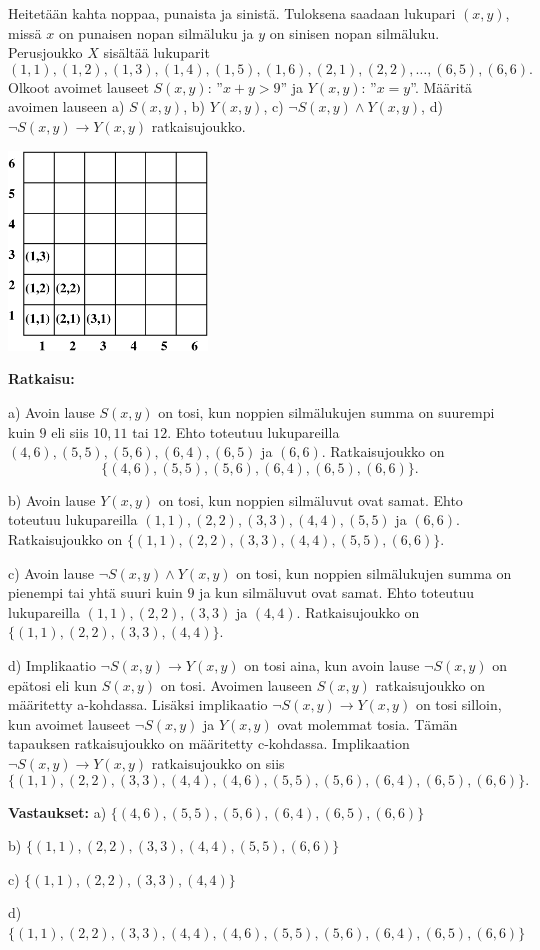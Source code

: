 \begin{esimerkki}
Heitetään kahta noppaa, punaista ja sinistä. Tuloksena saadaan lukupari $(x, y)$, missä $x$ on punaisen nopan silmäluku ja $y$ on sinisen nopan silmäluku. Perusjoukko $X$ sisältää lukuparit
\[
(1, 1), (1, 2), (1, 3), (1, 4), (1, 5), (1, 6), (2, 1), (2, 2),\ldots , (6, 5), (6, 6).
\]
Olkoot avoimet lauseet $S(x,y)$: ''$x + y > 9$'' ja $Y(x,y)$: ''$x = y$''. Määritä avoimen lauseen a) $S(x,y)$, b) $Y(x,y)$, c) $\lnot S(x,y) \land Y(x,y)$, d) $\lnot S(x,y) \to Y(x,y)$ ratkaisujoukko.

\begin{center}
\includegraphics[width=5.3cm]{pictures/6x6}
\end{center}

{\bf Ratkaisu:}

a) Avoin lause $S(x,y)$ on tosi, kun noppien silmälukujen summa on suurempi kuin $9$ eli siis $10, 11$ tai $12$. Ehto toteutuu lukupareilla $(4, 6), (5, 5), (5, 6), (6, 4), (6, 5)$ ja $(6, 6)$. Ratkaisujoukko on
\[
\{(4, 6), (5, 5), (5, 6), (6, 4), (6, 5), (6, 6)\}.
\]

b) Avoin lause $Y(x,y)$ on tosi, kun noppien silmäluvut ovat samat. Ehto toteutuu lukupareilla $(1, 1), (2, 2), (3, 3), (4, 4), (5, 5)$ ja $(6, 6)$. Ratkaisujoukko on $\{(1, 1), (2, 2), (3, 3), (4, 4), (5, 5), (6, 6)\}$.

c) Avoin lause $\lnot S(x,y) \land Y(x,y)$ on tosi, kun noppien silmälukujen summa on pienempi tai yhtä suuri kuin $9$ ja kun silmäluvut ovat samat. Ehto toteutuu lukupareilla $(1,1), (2, 2), (3, 3)$ ja $(4, 4)$. Ratkaisujoukko on $\{(1,1), (2, 2), (3, 3), (4, 4)\}$.


d) Implikaatio $\lnot S(x,y) \to Y(x,y)$ on tosi aina, kun avoin lause $\lnot S(x,y)$ on epätosi eli kun $S(x,y)$ on tosi. Avoimen lauseen $S(x,y)$ ratkaisujoukko on määritetty a-kohdassa. Lisäksi implikaatio $\lnot S(x,y) \to Y(x,y)$ on tosi silloin, kun avoimet lauseet $\lnot S(x,y)$ ja $Y(x,y)$ ovat molemmat tosia. Tämän tapauksen ratkaisujoukko on määritetty c-kohdassa. Implikaation $\lnot S(x,y) \to Y(x,y)$ ratkaisujoukko on siis
\[
\{(1,1), (2, 2), (3, 3), (4, 4), (4, 6), (5, 5), (5, 6), (6, 4), (6, 5), (6, 6)\}.
\]

{\bf Vastaukset:} a) $\{(4, 6), (5, 5), (5, 6), (6, 4), (6, 5), (6, 6)\}$

b) $\{(1, 1), (2, 2), (3, 3), (4, 4), (5, 5), (6, 6)\}$

c) $\{(1,1), (2, 2), (3, 3), (4, 4)\}$

d) $\{(1,1), (2, 2), (3, 3), (4, 4), (4, 6), (5, 5), (5, 6), (6, 4), (6, 5), (6, 6)\}$
\end{esimerkki}


